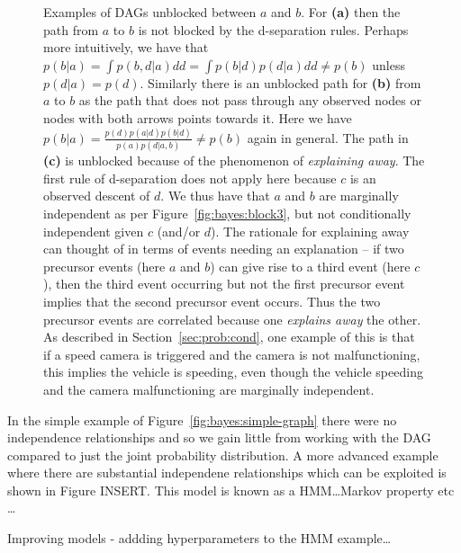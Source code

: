 \begin{figure}[p]
	\centering 
	\hspace{-15pt}
	\begin{subfigure}[t]{0.32\textwidth}
		\centering
		\resizebox{0.9\textwidth}{!}{
		}
		\caption{\label{fig:bayes:unblock1}}
	\end{subfigure}
	\begin{subfigure}[t]{0.32\textwidth}
		\centering
		\resizebox{0.9\textwidth}{!}{
		}
		\caption{\label{fig:bayes:unblock2}}
	\end{subfigure}
	\begin{subfigure}[t]{0.32\textwidth}
		\centering
		\resizebox{1.1\textwidth}{!}{
		}
		\caption{\label{fig:bayes:unblock3}}
	\end{subfigure}
	\caption{Examples of DAGs unblocked between $a$ and $b$. For \textbf{(a)} then the path from $a$ to
		$b$ is not blocked by the d-separation rules.  Perhaps more intuitively, we have that
		$p(b|a) = \int p(b,d|a) dd = \int p(b|d)p(d|a) dd \neq p(b)$ unless $p(d|a)=p(d)$.
		Similarly there is an unblocked path for \textbf{(b)} from $a$ to $b$ as the path
		that does not pass through any observed nodes or nodes with both arrows points towards it.
		Here we have $p(b|a) = \frac{p(d)p(a|d)p(b|d)}{p(a)p(d|a,b)} \neq p(b)$ again in general.
		The path in \textbf{(c)} is unblocked because of the phenomenon of \emph{explaining away}.
		The first rule of d-separation does not apply here because $c$ is an observed descent of
		$d$.  We thus have that $a$ and $b$ are marginally independent as per Figure~\ref{fig:bayes:block3},
		but not conditionally independent given $c$ (and/or $d$). The rationale for explaining away can thought
		of in terms of events needing an explanation -- if two precursor events (here $a$ and $b$) can give rise 
		to a third event (here $c$), then
		the third event occurring but not the first precursor event implies that the second precursor
		event occurs.  Thus the two precursor events are correlated because one \emph{explains away} the other.
		As described in Section~\ref{sec:prob:cond}, one example of this is that if a speed camera is
		triggered and the camera is not malfunctioning, this implies the vehicle is speeding, even though
		the vehicle speeding and the camera malfunctioning are marginally independent.	
		\label{fig:bayes:unblocked-graphs}}
\end{figure}

In the simple example of Figure~\ref{fig:bayes:simple-graph} there were no independence relationships and so
we gain little from working with the DAG compared to just the joint probability distribution.
A more advanced example where there are substantial independene relationships which can
be exploited is shown in Figure INSERT.  This model is known as a HMM\dots Markov property
etc \dots

Improving models - addding hyperparameters to the HMM example\dots